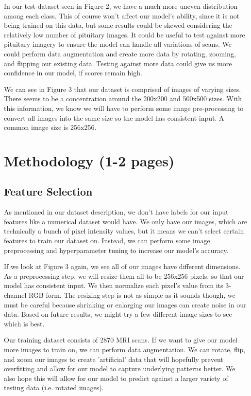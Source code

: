 \documentclass[conference]{IEEEtran}
\begin{document}
In our test dataset seen in Figure 2, we have a much more uneven distribution among each class. This of course won't affect our model's ability, since it is not being trained on this data, but some results could be skewed considering the relatively low number of pituitary images. It could be useful to test against more pituitary imagery to ensure the model can handle all variations of scans. We could perform data augmentation and create more data by rotating, zooming, and flipping our existing data. Testing against more data could give us more confidence in our model, if scores remain high.

We can see in Figure 3 that our dataset is comprised of images of varying sizes. There seems to be a concentration around the 200x200 and 500x500 sizes. With this information, we know we will have to perform some image pre-processing to convert all images into the same size so the model has consistent input. A common image size is 256x256.

\section{Methodology (1-2 pages)}

\subsection{Feature Selection}
As mentioned in our dataset description, we don't have labels for our input features like a numerical dataset would have. We only have our images, which are technically a bunch of pixel intensity values, but it means we can't select certain features to train our dataset on. Instead, we can perform some image preprocessing and hyperparameter tuning to increase our model's accuracy.

If we look at Figure 3 again, we see all of our images have different dimensions.  As a preprocessing step, we will resize them all to be 256x256 pixels, so that our model has consistent input. We then normalize each pixel's value from its 3-channel RGB form. The resizing step is not as simple as it sounds though, we must be careful because shrinking or enlarging our images can create noise in our data. Based on future results, we might try a few different image sizes to see which is best. 

Our training dataset consists of 2870 MRI scans. If we want to give our model more images to train on, we can perform data augmentation. We can rotate, flip, and zoom our images to create 'artificial' data that will hopefully prevent overfitting and allow for our model to capture underlying patterns better. We also hope this will allow for our model to predict against a larger variety of testing data (i.e. rotated images). 
\end{document}
